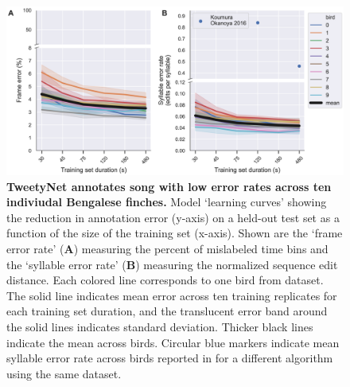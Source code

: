 \documentclass[10pt,letterpaper]{article}
\begin{document}
\begin{figure}[!ht]
\includegraphics[scale=0.75]{Figures/fig4/fig4-learning-curves-ai.png}
\caption{{\bf TweetyNet annotates song with low error rates across ten indiviudal Bengalese finches.}
Model ‘learning curves’ showing the reduction in annotation error (y-axis) 
on a held-out test set as a function of the size of the training set (x-axis). 
Shown are the ‘frame error rate’ (\textbf{A}) measuring the percent of mislabeled time bins 
and the ‘syllable error rate’ (\textbf{B}) measuring the normalized sequence edit distance. 
Each colored line corresponds to one bird from dataset. 
The solid line indicates mean error across ten training replicates 
for each training set duration, and the translucent error band 
around the solid lines indicates standard deviation. 
Thicker black lines indicate the mean across birds. 
Circular blue markers indicate mean syllable error rate across birds 
reported in \cite{koumura_automatic_2016-1} 
for a different algorithm using the same dataset.}
\label{fig4}
\end{figure}
\end{document}
